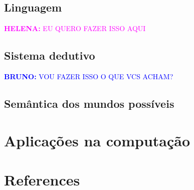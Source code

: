 \documentclass[12pt]{article}
\newcommand{\helena}[1]{\textcolor{magenta}{\textbf{HELENA:} #1}}
\newcommand{\bruno}[1]{\textcolor{blue}{\textbf{BRUNO:} #1}}
\begin{document}
  \subsection{Linguagem} \label{sec:linguagem}
  \helena{EU QUERO FAZER ISSO AQUI}
  \subsection{Sistema dedutivo} \label{sec:dedutivo}
  \bruno{VOU FAZER ISSO O QUE VCS ACHAM?}

\subsection{Semântica dos mundos possíveis} \label{sec:semantica}


\section{Aplicações na computação} \label{sec:aplicacoe}


\section{References}




\end{document}
